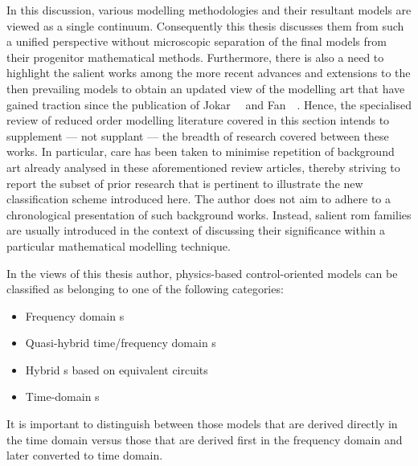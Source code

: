 In this discussion,  various modelling methodologies and  their resultant models
are viewed as  a single continuum. Consequently this thesis  discusses them from
such a  unified perspective without  microscopic separation of the  final models
from their progenitor mathematical methods. Furthermore, there is also a need to
highlight the salient works among the more recent advances and extensions to the
then  prevailing models  to obtain  an updated  view of  the modelling  art that
have  gained  traction  since the  publication  of  Jokar~\etal~\cite{Jokar2016}
and  Fan~\etal~\cite{Fan2015}. Hence,  the specialised  review of  reduced order
modelling  literature covered  in this  section  intends to  supplement ---  not
supplant --- the breadth of research covered between these works. In particular,
care has been taken to minimise repetition of background art already analysed in
these aforementioned review  articles, thereby striving to report  the subset of
prior research  that is  pertinent to illustrate  the new  classification scheme
introduced  here.  The  author  does  not  aim  to  adhere  to  a  chronological
presentation of such  background works. Instead, salient  \gls{rom} families are
usually  introduced in  the context  of discussing  their significance  within a
particular mathematical modelling technique.


In the views of this thesis author, physics-based control-oriented models can be
classified as belonging to one of the following categories:
\begin{itemize}
    \item Frequency domain s
    \item Quasi-hybrid time/frequency domain s
    \item Hybrid s based on equivalent circuits
    \item Time-domain s
\end{itemize}
It is important to distinguish between those models that are derived directly in
the time  domain versus  those that  are derived first  in the  frequency domain
and  later  converted  to  time  domain.


